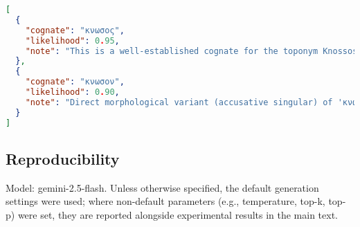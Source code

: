 \begin{lstlisting}[language=json, breaklines=true, basicstyle=\ttfamily\small]
[
  {
    "cognate": "κνωσος",
    "likelihood": 0.95,
    "note": "This is a well-established cognate for the toponym Knossos, widely confirmed in scholarly literature. Principle 1 (Distributional Similarity): Initial 'ko-' corresponds to 'κ', medial 'no' to 'ν', and final 'so' to 'σ'. The vowels 'o' in Linear B frequently correspond to 'ω' or 'ο' in Ancient Greek. This aligns with observed patterns for toponyms. Principle 2 (Monotonic Mapping): The relative order of phonemes k-n-s is strictly preserved. The representation of the Greek consonant cluster 'κν' by 'ko-no' and the long vowel 'ω' by 'o' are standard Mycenaean writing conventions, not reordering. Principle 3 (Structural Sparsity): The mapping efficiently accounts for the limitations of the Linear B syllabary, maintaining a high degree of one-to-one phonemic correspondence for the root. Principle 4 (Cognate Overlap): This correspondence is a canonical example of a toponym and strongly reinforces established phonetic and orthographic patterns between Linear B and Ancient Greek."
  },
  {
    "cognate": "κνωσον",
    "likelihood": 0.90,
    "note": "Direct morphological variant (accusative singular) of 'κνωσος'. Principle 1: Mapping of 'ko-no-' to 'κνω-' is identical; 'so' aligns with 'σον' (accusative ending). Principle 2: Relative order preserved; nominative 'ς' → accusative 'ν' is regular inflection, not reordering. Principle 3: Efficient mapping for an inflection with largely one-to-one correspondences. Principle 4: Consistent with documented declensional patterns and other LB→GR transformations."
  }
]
\end{lstlisting}


\subsection{Reproducibility}

Model: gemini-2.5-flash.
Unless otherwise specified, the default generation settings were used; where non-default parameters (e.g., temperature, top-k, top-p) were set, they are reported alongside experimental results in the main text.
